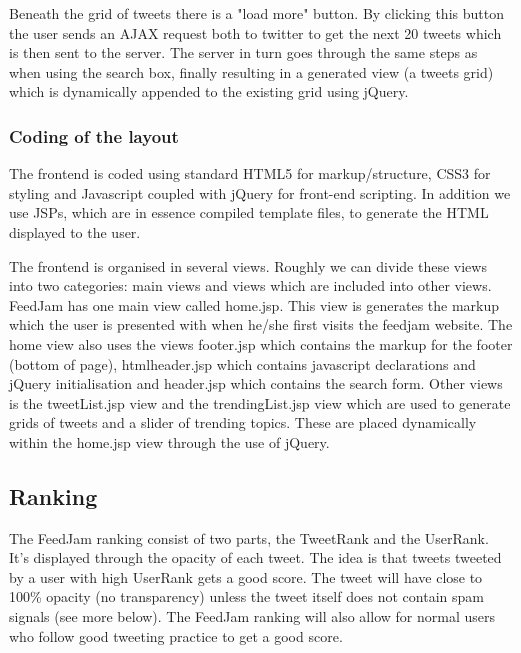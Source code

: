 Beneath the grid of tweets there is a "load more" button. By clicking this button the user sends an AJAX request both to twitter to get the next 20 tweets which is then sent to the server. The server in turn goes through the same steps as when using the search box, finally resulting in a generated view (a tweets grid) which is dynamically appended to the existing grid using jQuery.


\subsubsection{Coding of the layout}
The frontend is coded using standard HTML5 for markup/structure, CSS3 for styling and Javascript coupled with jQuery for front-end scripting. In addition we use JSPs, which are in essence compiled template files, to generate the HTML displayed to the user.

The frontend is organised in several views. Roughly we can divide these views into two categories: main views and views which are included into other views. FeedJam has one main view called home.jsp. This view is generates the markup which the user is presented with when he/she first visits the feedjam website. The home view also uses the views footer.jsp which contains the markup for the footer (bottom of page), htmlheader.jsp which contains javascript declarations and jQuery initialisation and header.jsp which contains the search form. Other views is the tweetList.jsp view and the trendingList.jsp view which are used to generate grids of tweets and a slider of trending topics. These are placed dynamically within the home.jsp view through the use of jQuery.


\subsection{Ranking} %
\label{ranking}
The FeedJam ranking consist of two parts, the TweetRank and the UserRank. It's displayed through the opacity of each tweet. The idea is that tweets tweeted by a user with high UserRank gets a good score. The tweet will have close to 100\% opacity (no transparency) unless the tweet itself does not contain spam signals (see more below). The FeedJam ranking will also allow for normal users who follow good tweeting practice to get a good score.

